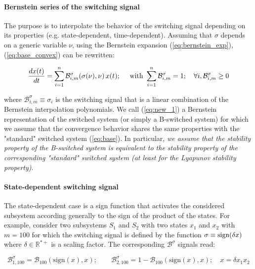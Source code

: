 \documentclass[12pt]{article}
\begin{document}
\paragraph{Bernstein series of the switching signal}

The purpose is to interpolate the behavior of the switching signal depending on its properties (e.g. state-dependent, time-dependent). 
Assuming that $\sigma$ depends on a generic variable $\nu$, using the Bernstein expansion (\ref{eq:bernstein_exp}), (\ref{eq:base_convex}) can be rewritten:

\begin{equation}\label{eq:new_1}
  \frac{d x(t)}{d t} = \sum_{i = 1}^n \mathcal{B}^{\sigma}_{i, m}(\sigma(\nu), \nu) \, x(t); \quad \hbox{ with }  \sum_{i = 1}^n \mathcal{B}^{\sigma}_{i,m} = 1;  \quad 
  \forall i, \mathcal{B}^{\sigma}_{i,m} \geq 0
\end{equation}

\noindent
where $\mathcal{B}^{\sigma}_{i, m} \equiv \sigma_i$ is the switching signal that is a linear combination of the Bernstein interpolation polynomials.
\noindent
We call (\ref{eq:new_1}) a Bernstein representation of the switched system (or simply a B-switched system) for which we assume that the convergence behavior shares the same 
properties with the "standard" switched system (\ref{eq:base}). In particular, {\it we assume that the stability property of the B-switched system is equivalent to the stability property 
of the corresponding "standard" switched system (at least for the Lyapunov stability property)}.

\paragraph{State-dependent switching signal} The state-dependent case is a sign function that activates the considered subsystem according generally to the sign of the product of the states. 
 For example, consider two subsystems $S_1$ and $S_2$ with two states $x_1$ and $x_2$ with $m = 100$ for which the switching signal 
 is defined by the function $\sigma \equiv \hbox{sign}(\delta x)$ where $\delta \in \mathbb{R}^{*+}$ is a scaling factor. The corresponding $\mathcal{B}^{\sigma}$ signals read:
 
 \begin{equation}\label{eq:b_sigma_def}
 \mathcal{B}^{\sigma}_{1, 100} = \mathcal{B}_{100} ( \mathrm{sign} (x),x); \qquad \mathcal{B}^{\sigma}_{2, 100} = 1 - \mathcal{B}_{100} ( \mathrm{sign} (x),x); \quad x = \delta x_1 x_2
 \end{equation}
 
\end{document}
